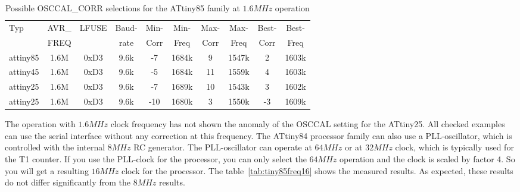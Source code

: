 \begin{table}[H]
  \begin{center}
    \begin{tabular}{| l | c | c | c || c | c || c | c || c | c |}
    \hline
   Typ  &       AVR\_ & LFUSE & Baud- & Min- & Min- & Max- & Max- & Best- & Best-  \\
        &       FREQ  &       & rate & Corr & Freq & Corr & Freq  & Corr  & Freq  \\
    \hline
    \hline
attiny85 &         1.6M & 0xD3  & 9.6k &  -7  & 1684k &  9  & 1547k  & 2  & 1603k \\
    \hline
attiny45  &        1.6M & 0xD3  & 9.6k &  -5  & 1684k & 11  & 1559k  & 4  & 1603k \\
    \hline
attiny25  &        1.6M & 0xD3  & 9.6k &  -7   & 1689k & 10 & 1543k  & 3  & 1602k \\
attiny25  &        1.6M & 0xD3  & 9.6k &  -10  & 1680k & 3  & 1550k  & -3  & 1609k \\
    \hline
    \end{tabular}
  \end{center}
  \caption{Possible OSCCAL\_CORR selections for the ATtiny85 family at \(1.6MHz\) operation}
  \label{tab:tiny85freq1}
\end{table}

The operation with \(1.6MHz\) clock frequency has not shown the anomaly of the
OSCCAL setting for the ATtiny25.
All checked examples can use the serial interface without any correction
at this frequency.
The ATtiny84 processor family can also use a PLL-oscillator, which is controlled
with the internal \(8MHz\) RC generator. The PLL-oscillator can operate at
\(64MHz\) or at \(32MHz\) clock, which is typically used for the T1 counter.
If you use the PLL-clock for the processor, you can only select the \(64MHz\) operation
and the clock is scaled by factor 4. So you will get a resulting \(16MHz\) clock
for the processor.
The table~\ref{tab:tiny85freq16} shows the measured results.
As expected, these results do not differ significantly from the \(8MHz\) results.

